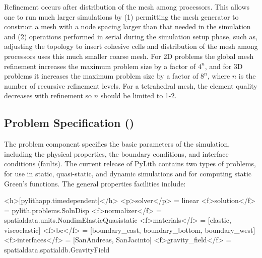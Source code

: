 Refinement occurs after distribution of the mesh among processors.
This allows one to run much larger simulations by (1) permitting the
mesh generator to construct a mesh with a node spacing larger than
that needed in the simulation and (2) operations performed in serial
during the simulation setup phase, such as, adjusting the topology
to insert cohesive cells and distribution of the mesh among processors
uses this much smaller coarse mesh. For 2D problems the global mesh
refinement increases the maximum problem size by a factor of $4^{n}$,
and for 3D problems it increases the maximum problem size by a factor
of $8^{n}$, where $n$ is the number of recursive refinement levels.
For a tetrahedral mesh, the element quality decreases with refinement
so $n$ should be limited to 1-2.


\subsection{Problem Specification (\protect{})}

The problem component specifies the basic parameters of the simulation,
including the physical properties, the boundary conditions, and interface
conditions (faults). The current release of PyLith contains two types
of problems,  for use in static, quasi-static,
and dynamic simulations and  for computing static
Green's functions. The general properties facilities include:
\begin{inventory}
\end{inventory}

\begin{cfg}
<h>[pylithapp.timedependent]</h>
<p>solver</p> = linear
<f>solution</f> = pylith.problems.SolnDisp
<f>normalizer</f> = spatialdata.units.NondimElasticQuasistatic
<f>materials</f> = [elastic, viscoelastic]
<f>bc</f> = [boundary_east, boundary_bottom, boundary_west]
<f>interfaces</f> = [SanAndreas, SanJacinto]
<f>gravity_field</f> = spatialdata.spatialdb.GravityField
\end{cfg}

